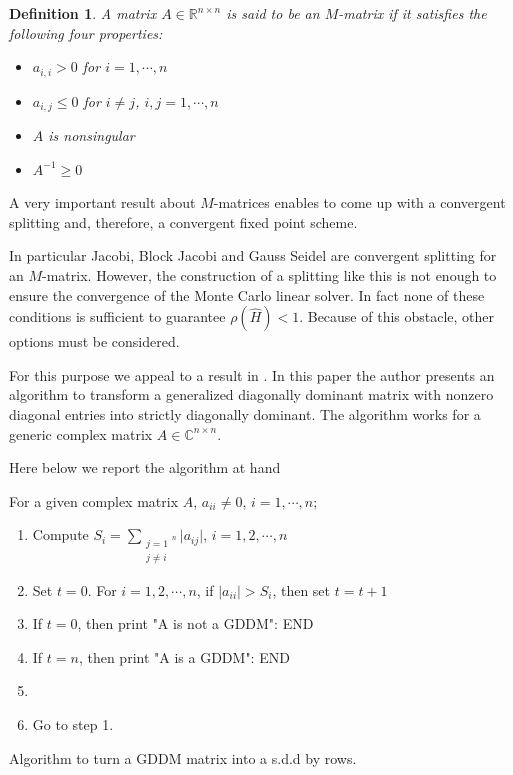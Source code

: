 \documentclass[a4paper,10pt]{article}
\newtheorem{defn}{Definition}
\begin{document}
\begin{defn}
A matrix $A\in\mathbb{R}^{n\times n}$ is said to be an $M$-matrix if it 
satisfies the following four properties:
\begin{itemize}
 \item $a_{i,i}>0$ for $i=1,\cdots,n$
 \item $a_{i,j}\le 0$ for $i\ne j$, $i,j=1,\cdots,n$
 \item $A$ is nonsingular
 \item $A^{-1}\ge 0$
\end{itemize}
\end{defn}


A very important result about $M$-matrices enables to come up with a convergent 
splitting and, therefore, a convergent fixed point scheme. 

In particular Jacobi, Block Jacobi and Gauss Seidel  are 
convergent 
splitting for an $M$-matrix.
However, the construction of a splitting like this is not enough to ensure the 
convergence of 
the Monte Carlo linear solver. In fact none of these conditions is sufficient 
to guarantee $\rho(\hat{H})<1$. Because of this obstacle, other options must 
be considered.\newline

For this purpose we 
appeal to a result in \cite{Li2002}. In this paper the author presents an 
algorithm to transform a generalized diagonally dominant matrix with 
nonzero diagonal entries into strictly diagonally dominant. The 
algorithm works for a generic complex matrix $A\in\mathbb{C}^{n\times n}$.

Here below we report the algorithm at hand\newline

\begin{algorithm}[H]
 For a given complex matrix $A$, $a_{ii}\ne 0$, $i=1,\cdots, n$;\newline
 \begin{enumerate}
  \item Compute $S_{i}=\sum_{\substack{j=1 \\ j\ne i}^{n}}\lvert 
a_{ij}\rvert$, 
$i=1,2,\cdots,n$
\item Set $t=0$. For $i=1,2,\cdots, n$, if $\lvert a_{ii}\rvert>S_i$, then set 
$t=t+1$
\item If $t=0$, then print "A is not a GDDM": END
\item If $t=n$, then print "A is a GDDM": END
\item {}
\item Go to step 1.
 \end{enumerate}
 \caption{Algorithm to turn a GDDM matrix into a s.d.d by rows.}
\end{algorithm}
\end{document}
